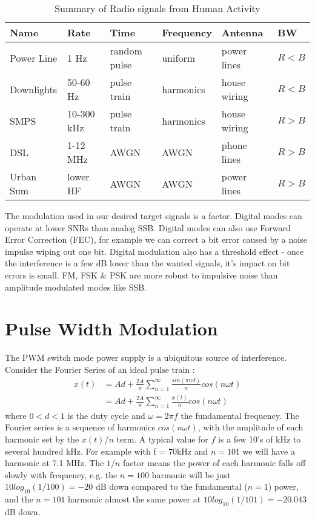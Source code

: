 \documentclass{article}
\begin{document}
\begin{table}[h]
\centering
\begin{tabular}{l l l l l l}
 \hline
 Name & Rate & Time & Frequency & Antenna & BW \\
 \hline
 Power Line & 1 Hz & random pulse & uniform & power lines & $R < B$ \\
 Downlights & 50-60 Hz & pulse train & harmonics & house wiring & $R < B$ \\
 SMPS & 10-300 kHz & pulse train & harmonics & house wiring & $R > B$ \\
 DSL & 1-12 MHz & AWGN & AWGN & phone lines & $R > B$ \\
 Urban Sum & lower HF & AWGN & AWGN & power lines & $R > B$ \\
 \hline
\end{tabular}
\caption{Summary of Radio signals from Human Activity}
\label{table:human_noise}
\end{table}

The modulation used in our desired target signals is a factor.  Digital modes can operate at lower SNRs than analog SSB.  Digital modes can also use Forward Error Correction (FEC), for example we can correct a bit error caused by a noise impulse wiping out one bit.  Digital modulation also has a threshold effect - once the interference is a few dB lower than the wanted signals, it's impact on bit errors is small. FM, FSK \& PSK are more robust to impulsive noise than amplitude modulated modes like SSB.

\section{Pulse Width Modulation}
\label{pwm}

The PWM switch mode power supply is a ubiquitous source of interference.  Consider the Fourier Series of an ideal pulse train \cite{wikipedia_pulse}:
\begin{equation} \label{eq_pwm}
\begin{split}
x(t) &= Ad+\frac{2A}{\pi} \sum_{n=1}^{\infty} \frac{sin(\pi n d)}{n}cos(n \omega t) \\
     &= Ad+\frac{2A}{\pi} \sum_{n=1}^{\infty} \frac{x(t)}{n} cos(n \omega t)
\end{split}
\end{equation}
where $0<d<1$ is the duty cycle and $\omega=2 \pi f$ the fundamental frequency.  The Fourier series is a sequence of harmonics $cos(n \omega t)$, with the amplitude of each harmonic set by the $x(t)/n$ term. A typical value for $f$ is a few 10's of kHz to several hundred kHz. For example with f = 70kHz and $n=101$ we will have a harmonic at 7.1 MHz. The $1/n$ factor means the power of each harmonic falls off slowly with frequency, e.g. the $n=100$ harmonic will be just $10log_{10}(1/100)=-20$ dB down compared to the fundamental ($n=1$) power, and the $n=101$ harmonic almost the same power at $10log_{10}(1/101)=-20.043$ dB down.
\end{document}
